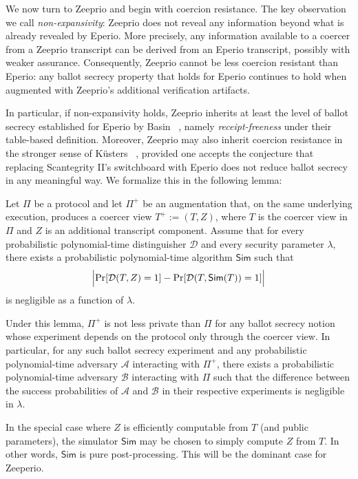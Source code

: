 
We now turn to Zeeprio and begin with coercion resistance. The key observation we call {\em non-expansivity}: Zeeprio does not reveal any information beyond what is already revealed by Eperio. More precisely, any information available to a coercer from a Zeeprio transcript can be derived from an Eperio transcript, possibly with weaker assurance. Consequently, Zeeprio cannot be less coercion resistant than Eperio: any ballot secrecy property that holds for Eperio continues to hold when augmented with Zeeprio’s additional verification artifacts. 

In particular, if non-expansivity holds, Zeeprio inherits at least the level of ballot secrecy established for Eperio by Basin \etal~\cite{BDGR21}, namely {\em receipt-freeness} under their table-based definition. Moreover, Zeeprio may also inherit coercion resistance in the stronger sense of K{\"u}sters \etal~\cite{KTV10c}, provided one accepts the conjecture that replacing Scantegrity II’s switchboard with Eperio does not reduce ballot secrecy in any meaningful way. We formalize this in the following lemma:

\begin{lemma}
Let $\Pi$ be a protocol and let $\Pi^{+}$ be an augmentation that, on the same underlying execution, produces a coercer view
$T^{+} := (T,Z)$, where $T$ is the coercer view in $\Pi$ and $Z$ is an additional transcript component.
Assume that for every probabilistic polynomial-time distinguisher $\mathcal{D}$ and every security parameter $\lambda$,
there exists a probabilistic polynomial-time algorithm $\mathsf{Sim}$ such that
\[
\Bigl|\Pr[\mathcal{D}(T,Z)=1] - \Pr[\mathcal{D}(T,\mathsf{Sim}(T))=1]\Bigr|
\]
is negligible as a function of $\lambda$.
\end{lemma}

Under this lemma, $\Pi^{+}$ is not less private than $\Pi$ for any ballot secrecy notion whose experiment depends on the protocol only through
the coercer view. In particular, for any such ballot secrecy experiment and any probabilistic polynomial-time adversary
$\mathcal{A}$ interacting with $\Pi^{+}$, there exists a probabilistic polynomial-time adversary
$\mathcal{B}$ interacting with $\Pi$ such that the difference between the success probabilities of
$\mathcal{A}$ and $\mathcal{B}$ in their respective experiments is negligible in $\lambda$.

 In the special case where $Z$ is efficiently computable from $T$ (and public parameters), the simulator
$\mathsf{Sim}$ may be chosen to simply compute $Z$ from $T$. In other words, $\mathsf{Sim}$ is pure post-processing. This will be the dominant case for Zeeperio.


